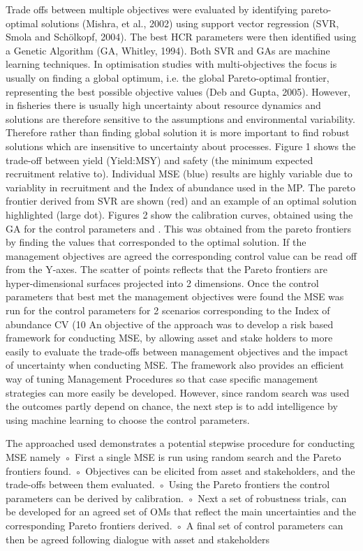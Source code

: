 \documentclass[12pt,doublespacing,a4paper]{ouparticle}
\begin{document}
Trade offs between multiple objectives were evaluated by identifying pareto-optimal solutions (Mishra, et al., 2002) using support vector regression (SVR, Smola and Schölkopf, 2004). The best HCR parameters were then identified using a Genetic Algorithm (GA, Whitley, 1994). Both SVR and GAs are machine learning techniques. 
In optimisation studies with multi-objectives the focus is usually on finding a global optimum, i.e. the global Pareto-optimal frontier, representing the best possible objective values (Deb and Gupta, 2005).  However, in fisheries  there is usually high uncertainty about resource dynamics and solutions are therefore sensitive to the assumptions and environmental variability.  Therefore rather than finding global solution it is more important to find  robust solutions which are insensitive to uncertainty about processes. 
Figure 1 shows the trade-off between yield (Yield:MSY) and safety (the minimum expected recruitment relative to). Individual MSE (blue) results are highly variable due to variablity in recruitment and the Index of abundance used in the MP. The pareto frontier   derived from SVR are shown (red) and an example of an optimal solution highlighted (large dot).
Figures 2 show the calibration curves, obtained using the GA for the control parameters  and . This was obtained from the pareto frontiers by finding the values that corresponded to the optimal solution. If the management objectives are agreed the corresponding control value can be read off from the Y-axes. The scatter of points reflects that the Pareto frontiers are hyper-dimensional surfaces projected into 2 dimensions.
Once the control parameters that best met the management objectives were found the MSE was run for the control parameters for 2 scenarios corresponding to the Index of abundance CV (10%
An objective of the approach was to develop a risk based framework for conducting MSE, by allowing asset and stake holders to more easily to evaluate the trade-offs between management objectives and the impact of uncertainty when conducting MSE. The framework also provides an efficient way of tuning Management Procedures so that case specific management strategies can more easily be developed. However, since random search was used the outcomes partly depend on chance, the next step is to add intelligence by using machine learning to choose the control parameters.

The approached used demonstrates a potential stepwise procedure for conducting MSE namely
        ◦ First a single MSE is run using random search and the Pareto frontiers found.
        ◦ Objectives can be elicited from asset and stakeholders, and the trade-offs between them evaluated.
        ◦ Using the Pareto frontiers the control parameters can be derived by calibration.
        ◦ Next a set of robustness trials, can be developed for an agreed set of OMs that reflect the main uncertainties and the corresponding Pareto frontiers derived.
        ◦ A final set of control parameters can then be agreed following dialogue with asset and stakeholders
\end{document}
